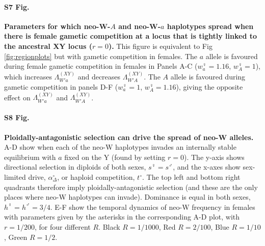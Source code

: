 \documentclass[10pt,letterpaper]{article}
\begin{document}
\paragraph*{S7 Fig.}
\label{fig:regionFemaleGS}
{\bf Parameters for which neo-W-$A$ and neo-W-$a$ haplotypes spread when there is female gametic competition at a locus that is tightly linked to the ancestral XY locus ($r=0$).}
This figure is equivalent to Fig \ref{fig:regionplots} but with gametic competition in females.
The $a$ allele is favoured during female gametic competition in females in Panels A-C ($w_{a}^\female=1.16$, $w_{A}^\female=1$), which increases $\Lambda_{W'a}^{(XY)}$ and decreases $\Lambda_{W'A}^{(XY)}$. 
The $A$ allele is favoured during gametic competition in panels D-F ($w_{a}^\female=1$, $w_{A}^\female=1.16$), giving the opposite effect on $\Lambda_{W'a}^{(XY)}$ and $\Lambda_{W'A}^{(XY)}$. 

\paragraph*{S8 Fig.}
\label{fig:regionPloidAntag}
{\bf Ploidally-antagonistic selection can drive the spread of neo-W alleles. }
A-D show when each of the neo-W haplotypes invades an internally stable equilibrium with $a$ fixed on the Y (found by setting $r=0$).
The y-axis shows directional selection in diploids of both sexes, $s^\female=s^\male$, and the x-axes show sex-limited drive, $\alpha_\Delta^\circ$, or haploid competition, $t^\circ$.
The top left and bottom right quadrants therefore imply ploidally-antagonistic selection (and these are the only places where neo-W haplotypes can invade).
Dominance is equal in both sexes, $h^\female=h^\male=3/4$. 
E-F show the temporal dynamics of neo-W frequency in females with parameters given by the asterisks in the corresponding A-D plot, with $r=1/200$, for four different $R$.
Black $R=1/1000$, Red $R=2/100$, Blue $R=1/10$, Green $R=1/2$.  
\end{document}
